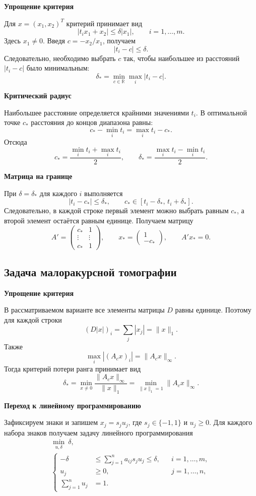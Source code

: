 \documentclass[12pt,a4paper]{article}
\numberwithin{equation}{section}
\newcommand{\theorypart}[1]{%
    \par\medskip
    \noindent\textbf{#1}\par\nopagebreak\smallskip
}
\begin{document}
\theorypart{Упрощение критерия}
Для $x=(x_1,x_2)^T$ критерий принимает вид
\[
    |t_ix_1+x_2|\leq\delta|x_1|,
    \qquad i=1,\ldots,m.
\]
Здесь $x_1\neq0$. Введя $c=-x_2/x_1$, получаем
\[
    |t_i-c|\leq\delta.
\]
Следовательно, необходимо выбрать $c$ так, чтобы наибольшее из
расстояний $|t_i-c|$ было минимальным:
\[
    \delta_* = \min_{c\in\mathbb{R}}\max_i |t_i-c|.
\]

\theorypart{Критический радиус}
Наибольшее расстояние определяется крайними значениями $t_i$.
В оптимальной точке $c_*$ расстояния до концов диапазона равны:
\[
    c_* - \min_i t_i = \max_i t_i - c_*.
\]
Отсюда
\[
    c_* = \frac{\min_i t_i+\max_i t_i}{2},
    \qquad
    \delta_* = \frac{\max_i t_i-\min_i t_i}{2}.
\]

\begin{samepage}
\theorypart{Матрица на границе}
При $\delta=\delta_*$ для каждого $i$ выполняется
\[
    |t_i-c_*|\leq\delta_*,
    \qquad
    c_*\in[t_i-\delta_*,\,t_i+\delta_*].
\]
Следовательно, в каждой строке первый элемент можно выбрать равным
$c_*$, а второй элемент остаётся равным единице. Получаем матрицу
\[
    A'=\begin{pmatrix}
        c_* & 1\\
        \vdots & \vdots\\
        c_* & 1
    \end{pmatrix},
    \qquad
    x_*=\begin{pmatrix}1\\-c_*\end{pmatrix},
    \qquad A'x_*=0.
\]
\end{samepage}

\subsection{Задача малоракурсной томографии}

\theorypart{Упрощение критерия}
В рассматриваемом варианте все элементы матрицы $D$ равны единице.
Поэтому для каждой строки
\[
    (D|x|)_i=\sum_j|x_j|=\|x\|_1.
\]
Также
\[
    \max_i |(A_cx)_i|=\|A_cx\|_\infty.
\]
Тогда критерий потери ранга принимает вид
\[
    \delta_* = \min_{x\neq0}
    \frac{\|A_cx\|_\infty}{\|x\|_1}
    =\min_{\|x\|_1=1}\|A_cx\|_\infty.
\]

\theorypart{Переход к линейному программированию}
Зафиксируем знаки и запишем
$x_j=s_ju_j$, где $s_j\in\{-1,1\}$ и $u_j\geq0$. Для каждого набора
знаков получаем задачу линейного программирования
\[
    \begin{gathered}
        \min_{u,\delta}\ \delta,\\[0.4em]
        \left\{
        \begin{aligned}
            -\delta&\leq\sum_{j=1}^{n}a_{ij}s_ju_j\leq\delta,
                && i=1,\ldots,m,\\
            u_j&\geq0,
                && j=1,\ldots,n,\\
            \sum_{j=1}^{n}u_j&=1.
        \end{aligned}
        \right.
    \end{gathered}
\]
\end{document}
